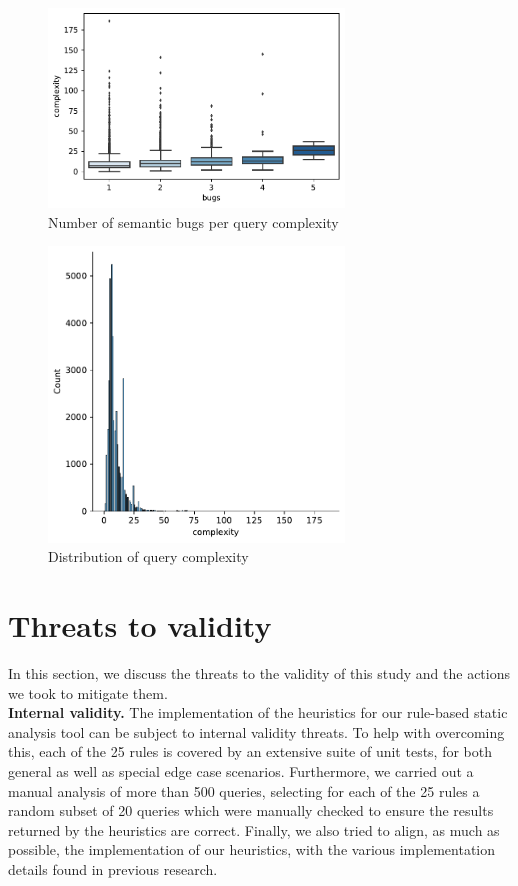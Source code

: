 \begin{figure}[ht]
    \centering
    \includegraphics[width=0.7\textwidth]{img/complexity_box.pdf}
    \caption{Number of semantic bugs per query complexity}
    \label{fig:complexity_box}
\end{figure}

\begin{figure}[!htbp]
    \centering
    \includegraphics[width=0.7\textwidth]{img/complexity_distribution.pdf}
    \caption{Distribution of query complexity}
    \label{fig:complexity_distribution}
\end{figure}

\newpage
\section{Threats to validity}

In this section, we discuss the threats to the validity of this study and the actions we took to mitigate them.\\

\noindent \textbf{Internal validity.} The implementation of the heuristics for our rule-based static analysis tool can be subject to internal validity threats. To help with overcoming this, each of the 25 rules is covered by an extensive suite of unit tests, for both general as well as special edge case scenarios. Furthermore, we carried out a manual analysis of more than 500 queries, selecting for each of the 25 rules a random subset of 20 queries which were manually checked to ensure the results returned by the heuristics are correct. Finally, we also tried to align, as much as possible, the implementation of our heuristics, with the various implementation details found in previous research.\\

